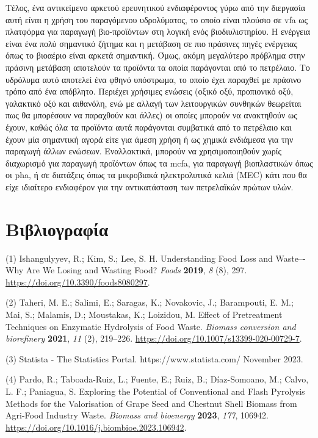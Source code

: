 \documentclass[11pt]{report}
\begin{document}
Τέλος, ένα αντικείμενο αρκετού ερευνητικού ενδιαφέροντος γύρω από την διεργασία αυτή είναι η χρήση του παραγόμενου υδρολύματος, το οποίο είναι πλούσιο σε \acrfull{vfa} ως πλατφόρμα για παραγωγή βιο-προϊόντων στη λογική ενός βιοδιυλιστηρίου. Η ενέργεια είναι ένα πολύ σημαντικό ζήτημα και η μετάβαση σε πιο πράσινες πηγές ενέργειας όπως το βιοαέριο είναι αρκετά σημαντική. Όμως, ακόμη μεγαλύτερο πρόβλημα στην πράσινη μετάβαση αποτελούν τα προϊόντα τα οποία παράγονται από το πετρέλαιο. Το υδρόλυμα αυτό αποτελεί ένα φθηνό υπόστρωμα, το οποίο έχει παραχθεί με πράσινο τρόπο από ένα απόβλητο. Περιέχει χρήσιμες ενώσεις (οξικό οξύ, προπιονικό οξύ, γαλακτικό οξύ και αιθανόλη, ενώ με αλλαγή των λειτουργικών συνθηκών θεωρείται πως θα μπορέσουν να παραχθούν και άλλες) οι οποίες μπορούν να ανακτηθούν ως έχουν, καθώς όλα τα προϊόντα αυτά παράγονται συμβατικά από το πετρέλαιο και έχουν μία σημαντική αγορά είτε για άμεση χρήση ή ως χημικά ενδιάμεσα για την παραγωγή άλλων ενώσεων. Εναλλακτικά, μπορούν να χρησιμοποιηθούν χωρίς διαχωρισμό για παραγωγή προϊόντων όπως τα \acrfull{mcfa}, για παραγωγή βιοπλαστικών όπως οι \acrfull{pha}, ή σε διατάξεις όπως τα μικροβιακά ηλεκτρολυτικά κελιά (MEC) κάτι που θα είχε ιδιαίτερο ενδιαφέρον για την αντικατάσταση των πετρελαϊκών πρώτων υλών.

\part*{Βιβλιογραφία}
\label{sec:org4bc6e2c}
\hypertarget{citeproc_bib_item_1}{(1) Ishangulyyev, R.; Kim, S.; Lee, S. H. Understanding Food Loss and Waste–-Why Are We Losing and Wasting Food? \textit{Foods} \textbf{2019}, \textit{8} (8), 297. \url{https://doi.org/10.3390/foods8080297}.}

\hypertarget{citeproc_bib_item_2}{(2) Taheri, M. E.; Salimi, E.; Saragas, K.; Novakovic, J.; Barampouti, E. M.; Mai, S.; Malamis, D.; Moustakas, K.; Loizidou, M. Effect of Pretreatment Techniques on Enzymatic Hydrolysis of Food Waste. \textit{Biomass conversion and biorefinery} \textbf{2021}, \textit{11} (2), 219–226. \url{https://doi.org/10.1007/s13399-020-00729-7}.}

\hypertarget{citeproc_bib_item_3}{(3) Statista - The Statistics Portal. https://www.statista.com/ November 2023.}

\hypertarget{citeproc_bib_item_4}{(4) Pardo, R.; Taboada-Ruiz, L.; Fuente, E.; Ruiz, B.; Díaz-Somoano, M.; Calvo, L. F.; Paniagua, S. Exploring the Potential of Conventional and Flash Pyrolysis Methods for the Valorisation of Grape Seed and Chestnut Shell Biomass from Agri-Food Industry Waste. \textit{Biomass and bioenergy} \textbf{2023}, \textit{177}, 106942. \url{https://doi.org/10.1016/j.biombioe.2023.106942}.}
\end{document}
